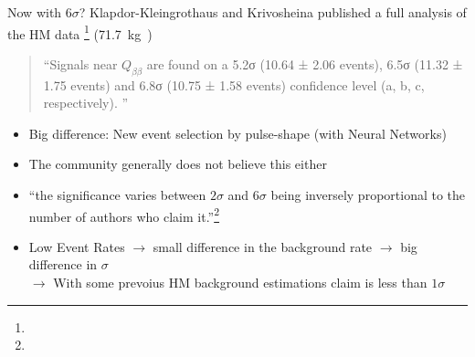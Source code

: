 \begin{frame}{Now with $6\sigma$?}
	Klapdor-Kleingrothaus and Krivosheina published a full analysis of the HM data \footnote{} (\SI{71.7}{\kilo\gram\year})
	\begin{quote}
		\enquote{Signals near $Q_{ββ}$ are found on a 5.2σ (10.64 ± 2.06 events), 6.5σ (11.32 ±
		1.75 events) and 6.8σ (10.75 ± 1.58 events) confidence level (a, b, c, respectively).
		}
	\end{quote}
	\vspace{-1em}
	\begin{itemize}
		\item Big difference: New event selection by pulse-shape (with Neural Networks)
		\item The community generally does not believe this either
		\item \enquote{the significance varies between $2\sigma$ and $6\sigma$ being inversely proportional to the number of authors who claim it.}\footnote{}
		\item Low Event Rates $\rightarrow$ small difference in the background rate $\rightarrow$ big difference in $\sigma$\\
			$\rightarrow$ With some prevoius HM background estimations claim is less than $1\sigma$ 
	\end{itemize}
\end{frame}
